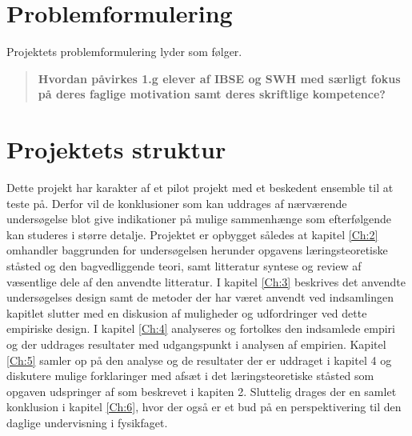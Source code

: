 \section{Problemformulering}
\label{sec:1.2}
Projektets problemformulering lyder som følger.
\begin{quote}
	{\bfseries Hvordan påvirkes 1.g elever af IBSE og SWH med særligt fokus på deres faglige motivation samt deres skriftlige kompetence?}
\end{quote}

\section{Projektets struktur}
\label{sec:1.3}

Dette projekt har karakter af et pilot projekt med et beskedent ensemble til at teste på. Derfor vil de konklusioner som kan uddrages af nærværende undersøgelse blot give indikationer på mulige sammenhænge som efterfølgende kan studeres i større detalje. Projektet er opbygget således at kapitel \vref{Ch:2} omhandler baggrunden for undersøgelsen herunder opgavens læringsteoretiske ståsted og den bagvedliggende teori, samt litteratur syntese og review af væsentlige dele af den anvendte litteratur. I kapitel \vref{Ch:3} beskrives det anvendte undersøgelses design samt de metoder der har været anvendt ved indsamlingen kapitlet slutter med en diskusion af muligheder og udfordringer ved dette empiriske design. I kapitel \vref{Ch:4} analyseres og fortolkes den indsamlede empiri og der uddrages resultater med udgangspunkt i analysen af empirien. Kapitel \vref{Ch:5} samler op på den analyse og de resultater der er uddraget i kapitel 4 og diskutere mulige forklaringer med afsæt i det læringsteoretiske ståsted som opgaven udspringer af som beskrevet i kapiten 2. Sluttelig drages der en samlet konklusion i kapitel \vref{Ch:6}, hvor der også er et bud på en perspektivering til den daglige undervisning i fysikfaget.
 